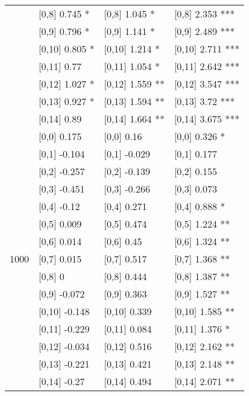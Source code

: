 \begin{table}
\begin{tabular}[t]{llll}
 & {}[0,8] 0.745 * & {}[0,8] 1.045 * & {}[0,8] 2.353 ***\\
 & {}[0,9] 0.796 * & {}[0,9] 1.141 * & {}[0,9] 2.489 ***\\
\addlinespace
 & {}[0,10] 0.805 * & {}[0,10] 1.214 * & {}[0,10] 2.711 ***\\
 & {}[0,11] 0.77 & {}[0,11] 1.054 * & {}[0,11] 2.642 ***\\
 & {}[0,12] 1.027 * & {}[0,12] 1.559 ** & {}[0,12] 3.547 ***\\
 & {}[0,13] 0.927 * & {}[0,13] 1.594 ** & {}[0,13] 3.72 ***\\
 & {}[0,14] 0.89 & {}[0,14] 1.664 ** & {}[0,14] 3.675 ***\\
\addlinespace
 & {}[0,0] 0.175 & {}[0,0] 0.16 & {}[0,0] 0.326 *\\
 & {}[0,1] -0.104 & {}[0,1] -0.029 & {}[0,1] 0.177\\
 & {}[0,2] -0.257 & {}[0,2] -0.139 & {}[0,2] 0.155\\
 & {}[0,3] -0.451 & {}[0,3] -0.266 & {}[0,3] 0.073\\
 & {}[0,4] -0.12 & {}[0,4] 0.271 & {}[0,4] 0.888 *\\
\addlinespace
 & {}[0,5] 0.009 & {}[0,5] 0.474 & {}[0,5] 1.224 **\\
 & {}[0,6] 0.014 & {}[0,6] 0.45 & {}[0,6] 1.324 **\\
1000 & {}[0,7] 0.015 & {}[0,7] 0.517 & {}[0,7] 1.368 **\\
 & {}[0,8] 0 & {}[0,8] 0.444 & {}[0,8] 1.387 **\\
 & {}[0,9] -0.072 & {}[0,9] 0.363 & {}[0,9] 1.527 **\\
\addlinespace
 & {}[0,10] -0.148 & {}[0,10] 0.339 & {}[0,10] 1.585 **\\
 & {}[0,11] -0.229 & {}[0,11] 0.084 & {}[0,11] 1.376 *\\
 & {}[0,12] -0.034 & {}[0,12] 0.516 & {}[0,12] 2.162 **\\
 & {}[0,13] -0.221 & {}[0,13] 0.421 & {}[0,13] 2.148 **\\
 & {}[0,14] -0.27 & {}[0,14] 0.494 & {}[0,14] 2.071 **\\
\bottomrule
\end{tabular}
\end{table}
